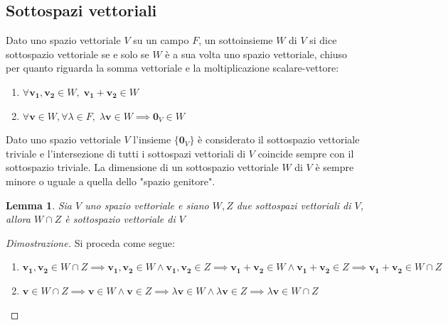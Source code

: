\documentclass{article}
\newtheorem{lemma}{Lemma}
\begin{document}
\subsection{Sottospazi vettoriali}
    Dato uno spazio vettoriale $V$ su un campo $F$, un sottoinsieme $W$ di $V$ si dice sottospazio vettoriale se e solo se $W$ è a sua volta uno spazio vettoriale, chiuso per quanto riguarda 
    la somma vettoriale e la moltiplicazione scalare-vettore:

    \begin{enumerate}[label=(\arabic*)]
        \item $\forall \mathbf{v_1}, \mathbf{v_2} \in W, \; \mathbf{v_1} + \mathbf{v_2} \in W$ 
        \item $\forall \mathbf{v} \in W, \forall \lambda \in F, \; \lambda \mathbf{v} \in W \implies \mathbf{0}_V \in W$
    \end{enumerate}
    
    Dato uno spazio vettoriale $V$ l'insieme $\{\mathbf{0}_V\}$ è considerato il sottospazio vettoriale triviale e l'intersezione di tutti i sottospazi
    vettoriali di $V$ coincide sempre con il sottospazio triviale. La dimensione di un sottospazio vettoriale $W$ di $V$ è sempre minore o uguale a quella dello "spazio genitore".

    \vspace{10pt}
    \begin{lemma}
       Sia $V$ uno spazio vettoriale e siano $W, Z$ due sottospazi vettoriali di $V$, allora $W \cap Z$ è sottospazio vettoriale di $V$ 
    \end{lemma}
    \begin{proof}[Dimostrazione]
        Si proceda come segue:
        \begin{enumerate}[label=(\Roman*)]
            \item $\mathbf{v_1}, \mathbf{v_2} \in W \cap Z \implies \mathbf{v_1}, \mathbf{v_2} \in W \land \mathbf{v_1}, \mathbf{v_2} \in Z \implies \mathbf{v_1} + \mathbf{v_2} \in W \land \mathbf{v_1} + \mathbf{v_2} \in Z \implies \mathbf{v_1} + \mathbf{v_2} \in W \cap Z$
            \item $\mathbf{v} \in W \cap Z \implies \mathbf{v} \in W \land \mathbf{v} \in Z \implies \lambda \mathbf{v} \in W \land \lambda \mathbf{v} \in Z \implies \lambda \mathbf{v} \in W \cap Z$
        \end{enumerate}
    \end{proof}
\end{document}
